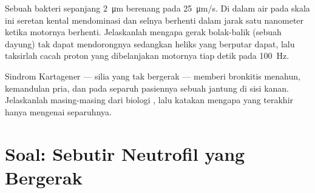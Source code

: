 \begin{exercise}[$\star\star\star$]\label{exo:b3:cytoskeleton-motility:11}
Sebuah bakteri sepanjang \qty{2}{\micro m} berenang pada \qty{25}{\micro m/s}.
Di dalam air pada skala ini seretan kental mendominasi dan selnya berhenti
dalam jarak satu nanometer ketika motornya berhenti. Jelaskanlah mengapa gerak
bolak-balik (sebuah dayung) tak dapat mendorongnya sedangkan heliks yang
berputar dapat, lalu taksirlah cacah proton yang dibelanjakan motornya tiap
detik pada \qty{100}{Hz}.
\end{exercise}

\begin{exercise}[$\star\star\star$]\label{exo:b3:cytoskeleton-motility:12}
Sindrom Kartagener --- silia yang tak bergerak --- memberi bronkitis menahun,
kemandulan pria, dan pada separuh pasiennya sebuah jantung di sisi kanan.
Jelaskanlah masing-masing dari biologi , lalu katakan mengapa yang
terakhir hanya mengenai separuhnya.
\end{exercise}

\section{Soal: Sebutir Neutrofil yang Bergerak}

